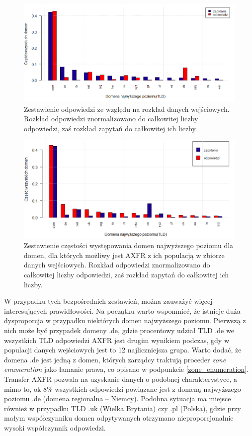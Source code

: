 \begin{figure}[h]
	\centering
	\includegraphics[width=1.0\textwidth]{image/req_to_resp_no_title}
	\caption{Zestawienie odpowiedzi ze względu na rozkład danych wejściowych. Rozkład odpowiedzi znormalizowano do całkowitej liczby
	odpowiedzi, zaś rozkład zapytań do całkowitej ich liczby.}
	\label{req_to_resp}
\end{figure}

\begin{figure}[h]
	\centering
	\includegraphics[width=1.0\textwidth]{image/resp_to_req_no_title}
	\caption{Zestawienie częstości występowania domen najwyższego poziomu dla domen, dla których możliwy jest AXFR z ich populacją
	w zbiorze danych wejściowych. Rozkład odpowiedzi znormalizowano do całkowitej liczby
	odpowiedzi, zaś rozkład zapytań do całkowitej ich liczby.}
	\label{resp_to_req}
\end{figure}

W przypadku tych bezpośrednich zestawień, można zauważyć więcej interesujących prawidłowości. Na początku warto wspomnieć, że
istnieje duża dysproporcja w przypadku niektórych domen najwyższego poziomu. Pierwszą z nich może być przypadek domeny .de,
gdzie procentowy udział TLD .de we wszystkich TLD odpowiedzi AXFR jest drugim wynikiem podczas, gdy w populacji danych wejściowych
jest to 12 najliczniejsza grupa. Warto dodać, że domena .de jest jedną z domen, których zarządcy traktują proceder
\textit{zone enumeration} jako łamanie prawa, co opisano w podpunkcie \ref{zone_enumeration}. Transfer AXFR pozwala na uzyskanie
danych o podobnej charakterystyce, a mimo to, ok 8\% wszystkich odpowiedzi powiązane jest z domeną najwyższego poziomu .de
(domena regionalna -- Niemcy). Podobna sytuacja ma miejsce również w przypadku TLD .uk (Wielka Brytania) czy .pl (Polska),
gdzie przy małym współczynniku domen odpytywanych otrzymano nieproporcjonalnie wysoki współczynnik odpowiedzi.

